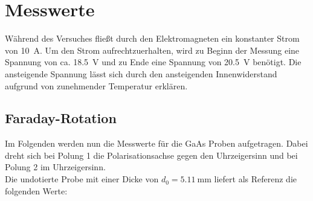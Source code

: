 \section{Messwerte}
\noindent Während des Versuches fließt durch den Elektromagneten ein konstanter Strom von \qty{10}{\ampere}. Um den Strom aufrechtzuerhalten, 
wird zu Beginn der Messung eine Spannung von ca. \qty{18.5}{\volt} und zu Ende eine Spannung von \qty{20.5}{\volt} benötigt. Die ansteigende 
Spannung lässt sich durch den ansteigenden Innenwiderstand aufgrund von zunehmender Temperatur erklären.\\

\subsection{Faraday-Rotation}
\noindent Im Folgenden werden nun die Messwerte für die GaAs Proben aufgetragen.
Dabei dreht sich bei Polung 1 die Polarisationsachse gegen den Uhrzeigersinn und bei Polung 2 im Uhrzeigersinn.\\
\noindent Die undotierte Probe mit einer Dicke von $d_0=\qty{5.11}{\milli \meter}$ liefert als Referenz die folgenden Werte:

